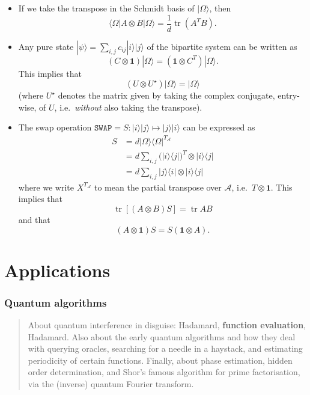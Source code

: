 \documentclass[fleqn,a4paper]{article}
\let\oldsection\section
\renewcommand\section{\clearpage\oldsection}
\let\oldpart\part
\renewcommand\part{\clearpage\oldpart}
\theoremstyle{definition}
\theoremstyle{definition}
\theoremstyle{definition}
\theoremstyle{definition}
\theoremstyle{remark}
\begin{document}
\begin{itemize}
\item
  If we take the transpose in the Schmidt basis of \(|\Omega\rangle\), then
  \[
    \langle\Omega|A\otimes B|\Omega\rangle = \frac{1}{d}\operatorname{tr}(A^T B).
  \]
\item
  Any pure state \(|\psi\rangle=\sum_{i,j} c_{ij}|i\rangle|j\rangle\) of the bipartite system can be written as
  \[
    (C\otimes\mathbf{1})|\Omega\rangle = (\mathbf{1}\otimes C^T)|\Omega\rangle.
  \]
  This implies that
  \[
    (U\otimes U^\star)|\Omega\rangle=|\Omega\rangle
  \]
  (where \(U^\star\) denotes the matrix given by taking the complex conjugate, entry-wise, of \(U\), i.e.~\emph{without} also taking the transpose).
\item
  The swap operation \(\texttt{SWAP}=S\colon|i\rangle|j\rangle\mapsto|j\rangle|i\rangle\) can be expressed as
  \[
    \begin{aligned}
      S
      &= d |\Omega\rangle\langle\Omega|^{T_{\mathcal{A}}}
    \\&= d \sum_{i,j} \big(|i\rangle\langle j|\big)^T\otimes|i\rangle\langle j|
    \\&= d \sum_{i,j} |j\rangle\langle i|\otimes|i\rangle\langle j|
    \end{aligned}
  \]
  where we write \(X^{T_{\mathcal{A}}}\) to mean the partial transpose over \(\mathcal{A}\), i.e.~\(T\otimes\mathbf{1}\).
  This implies that
  \[
    \operatorname{tr}[(A\otimes B)S] = \operatorname{tr}AB
  \]
  and that
  \[
    (A\otimes\mathbf{1})S = S(\mathbf{1}\otimes A).
  \]
\end{itemize}

\hypertarget{part-applications}{%
\part{Applications}\label{part-applications}}

\hypertarget{quantum-algorithms}{%
\section{Quantum algorithms}\label{quantum-algorithms}}

\begin{quote}
About quantum interference in disguise: Hadamard, \textbf{function evaluation}, Hadamard.
Also about the early quantum algorithms and how they deal with querying oracles, searching for a needle in a haystack, and estimating periodicity of certain functions.
Finally, about phase estimation, hidden order determination, and Shor's famous algorithm for prime factorisation, via the (inverse) quantum Fourier transform.
\end{quote}
\end{document}
